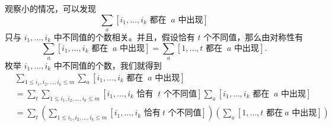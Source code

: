     观察小的情况，可以发现
    $$
    \sum_a[i_1,\ldots,i_k\text{ 都在 }\ a\text{ 中出现}]
    $$
    只与 $i_1,\ldots,i_k$ 中不同值的个数相关。并且，假设恰有 $t$ 个不同值，那么由对称性有
    $$
    \sum_a[i_1,\ldots,i_k\text{ 都在 }\ a\text{ 中出现}]=\sum_a[1,\ldots,t\text{ 都在 }\ a\text{ 中出现}].
    $$
    枚举 $i_1,\ldots,i_k$ 中不同值的个数，我们就得到
    $$
    \begin{aligned}
        &\sum_{1\le i_1,i_2,\ldots,i_k\le m}\sum_a[i_1,\ldots,i_k\text{ 都在 }\ a\text{ 中出现}]\\
        &=\sum_t\sum_{1\le i_1,i_2,\ldots,i_k\le m}[i_1,\ldots,i_k\text{ 恰有 }\ t\text{ 个不同值}]\sum_a[i_1,\ldots,i_k\text{ 都在 }\ a\text{ 中出现}]\\
        &=\sum_t\left(\sum_{1\le i_1,i_2,\ldots,i_k\le m}[i_1,\ldots,i_k\text{ 恰有}\ t\text{ 个不同值}]\right)\left(\sum_a[1,\ldots,t\text{ 都在}\ a\text{ 中出现}]\right)
        \end{aligned}
    $$

